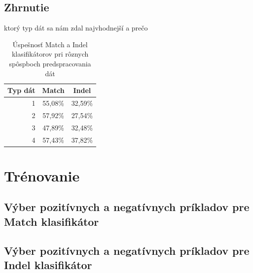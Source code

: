 
\subsection{Zhrnutie}

\todo ktorý typ dát sa nám zdal najvhodnejší a prečo



\begin{table}[htp]
\centering
\begin{tabular}{r|cc}
Typ dát & Match & Indel\\
\hline
1 & 55,08\% & 32,59\%\\
2 & 57,92\% & 27,54\%\\
3 & 47,89\% & 32,48\%\\
4 & 57,43\% & 37,82\%\\
\end{tabular}
\caption[Úspešnosť klasifikátorov pri rôznych typoch dát]{Úspešnosť Match a Indel klasifikátorov pri rôznych spôspboch predspracovania dát}
\label{tab:datatype3}
\end{table}

\section{Trénovanie}

\subsection{Výber pozitívnych a negatívnych príkladov pre Match klasifikátor}

\subsection{Výber pozitívnych a negatívnych príkladov pre Indel klasifikátor}






